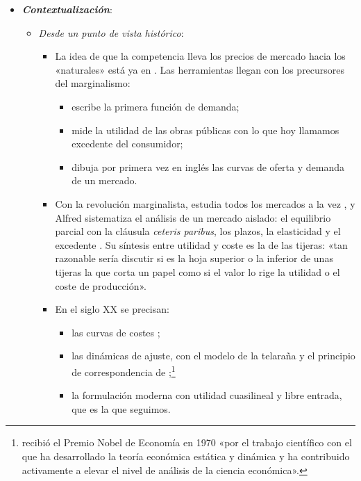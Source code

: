 \documentclass[11pt]{article}
\begin{document}
\begin{itemize}
\item \textbf{\emph{Contextualización}}:
  \begin{itemize}
  \item \emph{Desde un punto de vista histórico}:
  \begin{itemize}
  \item La idea de que la competencia lleva los precios de mercado hacia los «naturales» está ya en \textcite[libro~I, cap.~VII]{Smith1776Wealth} . Las herramientas llegan con los precursores del marginalismo:
    \begin{itemize}
    \item \textcite{Cournot1838Recherches} escribe la primera función de demanda;
    \item \textcite{Dupuit1844Mesure} mide la utilidad de las obras públicas con lo que hoy llamamos excedente del consumidor;
    \item \textcite{Jenkin1870Graphic} dibuja por primera vez en inglés las curvas de oferta y demanda de un mercado\nocite{HET2026Jenkin}.
    \end{itemize}
  \item Con la revolución marginalista, \textcite{Walras1874Elements} estudia todos los mercados a la vez , y Alfred \textcite{Marshall1890Principles} sistematiza el análisis de un mercado aislado: el equilibrio parcial con la cláusula \emph{ceteris paribus}, los plazos, la elasticidad y el excedente . Su síntesis entre utilidad y coste es la de las tijeras: «tan razonable sería discutir si es la hoja superior o la inferior de unas tijeras la que corta un papel como si el valor lo rige la utilidad o el coste de producción»\nocite{Marshall1890Principles}.
  \item En el siglo XX se precisan:
    \begin{itemize}
    \item las curvas de costes\nocite{Viner1931Cost} ;
    \item las dinámicas de ajuste, con el modelo de la telaraña\nocite{Kaldor1934Classificatory,Ezekiel1938Cobweb} y el principio de correspondencia de \textcite{Samuelson1941Stability};\footnote{ recibió el Premio Nobel de Economía en 1970 «por el trabajo científico con el que ha desarrollado la teoría económica estática y dinámica y ha contribuido activamente a elevar el nivel de análisis de la ciencia económica»\nocite{Nobel1970Samuelson}.}
    \item la formulación moderna con utilidad cuasilineal y libre entrada\nocite{MasColellWhinstonGreen1995}, que es la que seguimos.
    \end{itemize}
  \end{itemize}
  \end{itemize}


\end{itemize}
\end{document}
